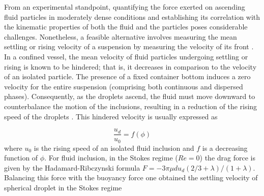 From an experimental standpoint, quantifying the force exerted on ascending fluid particles in moderately dense conditions and establishing its correlation with the kinematic properties of both the fluid and the particles poses considerable challenges. Nonetheless, a feasible alternative involves measuring the mean settling or rising velocity of a suspension by measuring the velocity of its front \citep{guazzelli2011}. In a confined vessel, the mean velocity of fluid particles undergoing settling or rising is known to be hindered; that is, it decreases in comparison to the velocity of an isolated particle. The presence of a fixed container bottom induces a zero velocity for the entire suspension (comprising both continuous and dispersed phases). Consequently, as the droplets ascend, the fluid must move downward to counterbalance the motion of the inclusions, resulting in a reduction of the rising speed of the droplets \citep{guazzelli2011}. This hindered velocity is usually expressed as




\begin{equation}
\frac{u_d}{u_0} = f(\phi)
\end{equation}
where $u_0$ is the rising speed of an isolated fluid inclusion and $f$ is a decreasing function of $\phi$. For fluid inclusion, in the Stokes regime ($Re=0$) the drag force is given by the Hadamard-Ribczynski formula $ F = -3\pi \mu d u_d (2/3+\lambda)/(1+\lambda)$. %
Balancing this force with the buoyancy force one obtained the settling velocity of  spherical droplet in the Stokes regime

